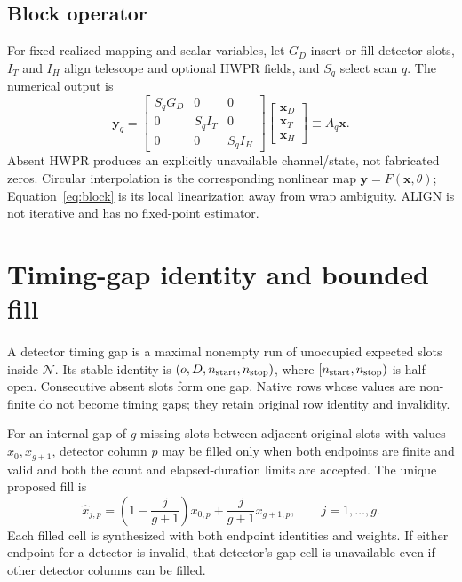 \documentclass[11pt]{article}
\newcommand{\state}[1]{\mathrm{#1}}
\begin{document}
\subsection{Block operator}

For fixed realized mapping and scalar variables, let \(G_D\) insert or fill
detector slots, \(I_T\) and \(I_H\) align telescope and optional HWPR fields,
and \(S_q\) select scan \(q\).  The numerical output is
\begin{equation}
 \boldsymbol y_q=
 \begin{bmatrix}
 S_qG_D&0&0\\
 0&S_qI_T&0\\
 0&0&S_qI_H
 \end{bmatrix}
 \begin{bmatrix}\boldsymbol x_D\\\boldsymbol x_T\\\boldsymbol x_H\end{bmatrix}
 \equiv A_q\boldsymbol x.
 \label{eq:block}
\end{equation}
Absent HWPR produces an explicitly unavailable channel/state, not fabricated
zeros.  Circular interpolation is the corresponding nonlinear map
\(\boldsymbol y=F(\boldsymbol x,\theta)\); Equation~\eqref{eq:block} is its
local linearization away from wrap ambiguity.  ALIGN is not iterative and has
no fixed-point estimator.

\section{Timing-gap identity and bounded fill}

A detector timing gap is a maximal nonempty run of unoccupied expected slots
inside \(\mathcal N\).  Its stable identity is
\((o,D,n_{\rm start},n_{\rm stop})\), where
\([n_{\rm start},n_{\rm stop})\) is half-open.  Consecutive absent slots form
one gap.  Native rows whose values are non-finite do not become timing gaps;
they retain original row identity and invalidity.

For an internal gap of \(g\) missing slots between adjacent original slots
with values \(x_0,x_{g+1}\), detector column \(p\) may be filled only when
both endpoints are finite and valid and both the count and elapsed-duration
limits are accepted.  The unique proposed fill is
\begin{equation}
 \widehat x_{j,p}=\left(1-\frac{j}{g+1}\right)x_{0,p}
 +\frac{j}{g+1}x_{g+1,p},\qquad j=1,\ldots,g.
 \label{eq:gap}
\end{equation}
Each filled cell is \(\state{synthesized}\) with both endpoint identities and
weights.  If either endpoint for a detector is invalid, that detector's gap
cell is unavailable even if other detector columns can be filled.
\end{document}
